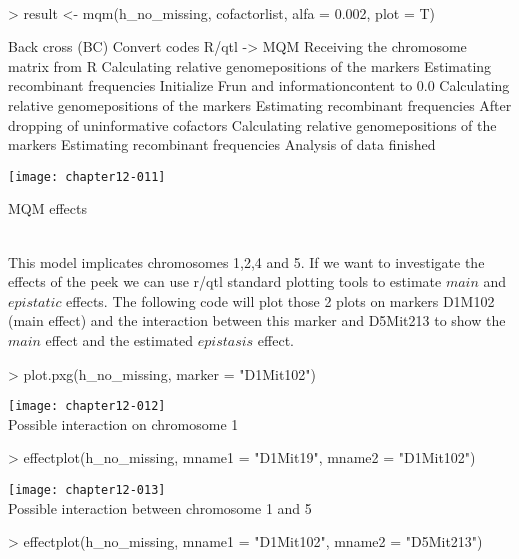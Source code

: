 \documentclass[a4paper]{article}
\begin{document}
\\
\begin{Schunk}
\begin{Sinput}
> result <- mqm(h_no_missing, cofactorlist, alfa = 0.002, plot = T)
\end{Sinput}
\begin{Soutput}
Back cross (BC)
Convert codes R/qtl -> MQM
Receiving the chromosome matrix from R
Calculating relative genomepositions of the markers
Estimating recombinant frequencies
Initialize Frun and informationcontent to 0.0
Calculating relative genomepositions of the markers
Estimating recombinant frequencies
After dropping of uninformative cofactors
Calculating relative genomepositions of the markers
Estimating recombinant frequencies
Analysis of data finished
\end{Soutput}
\end{Schunk}
\texttt{[image: chapter12-011]}
\clearpage
\begin{Large} MQM effects \end{Large}\\
This model implicates chromosomes 1,2,4 and 5. If we want to investigate the effects of the peek we can use r/qtl standard plotting tools
to estimate $main$ and $epistatic$ effects. The following code will plot those 2 plots on markers D1M102 (main effect) and the interaction between this marker and D5Mit213 to show the $main$ effect and the estimated $epistasis$ effect.
\\
\begin{Schunk}
\begin{Sinput}
> plot.pxg(h_no_missing, marker = "D1Mit102")
\end{Sinput}
\end{Schunk}
\texttt{[image: chapter12-012]}
\\
Possible interaction on chromosome 1
\\
\begin{Schunk}
\begin{Sinput}
> effectplot(h_no_missing, mname1 = "D1Mit19", mname2 = "D1Mit102")
\end{Sinput}
\end{Schunk}
\texttt{[image: chapter12-013]}
\\
Possible interaction between chromosome 1 and 5
\\
\begin{Schunk}
\begin{Sinput}
> effectplot(h_no_missing, mname1 = "D1Mit102", mname2 = "D5Mit213")
\end{Sinput}
\end{Schunk}
\end{document}
